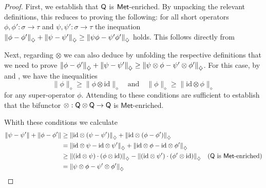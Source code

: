 \documentclass[10pt,a4paper]{amsart}
\theoremstyle{definition}
\theoremstyle{definition}
\theoremstyle{definition}
\theoremstyle{definition}
\theoremstyle{definition}
\theoremstyle{definition}
\begin{document}
\begin{proof}
  First, we establish that $\mathsf{Q}$ is $\mathsf{Met}$-enriched. By unpacking the relevant definitions, this reduces to proving the following: for all short operators $\phi, \phi' : \sigma \to \tau$ and $\psi, \psi' : \sigma \to \tau$ the inequation $\left\lVert \phi-\phi' \right\rVert_{\diamondsuit} + \left\lVert \psi-\psi' \right\rVert_{\diamondsuit} \geq \left\lVert \psi\phi-\psi'\phi' \right\rVert_{\diamondsuit} $ holds. This follows directly from \cite[Proposition 3.38 (second statement)]{watrous2018theory}

  Next, regarding $\otimes$ we can also deduce by unfolding the respective definitions that we need to prove $ \left\lVert \phi - \phi' \right\rVert_{\diamondsuit} + \left\lVert \psi - \psi' \right\rVert_{\diamondsuit} \geq \left\lVert \psi \otimes \phi - \psi' \otimes \phi' \right\rVert_{\diamondsuit}$. 
  For this case,  by \cite[Corollary 3.47]{watrous2018theory} and \cite[Proposition 3.44]{watrous2018theory} , we have the inequalities  
  \[
  \| \phi \|_\diamond \geq \| \phi \otimes \mathrm{id} \|_\diamond
  \quad \text{and} \quad  
  \| \phi \|_\diamond \geq \| \mathrm{id} \otimes \phi \|_\diamond
  \]  
  for any super-operator \( \phi \). Attending to \cite[ Proof of proposition 4.1]{dahlqvist2023syntactic} these conditions are sufficient to establish that the bifunctor $\otimes : \mathsf{Q} \otimes \mathsf{Q} \to \mathsf{Q}$ is $\mathsf{Met}$-enriched.


   Whith these conditions we calculate
  \begin{align*}
      \|\psi - \psi'\| + \|\phi - \phi'\| 
      &\geq \left\lVert \mathrm{id} \otimes \left(\psi-\psi'\right) \right\rVert_{\diamondsuit} + \left\lVert \mathrm{id} \otimes \left(\phi-\phi'\right) \right\rVert_{\diamondsuit}  \\
      &=  \left\lVert \mathrm{id} \otimes \psi- \mathrm{id} \otimes\psi' \right\rVert_{\diamondsuit} + \left\lVert \mathrm{id} \otimes \phi- \mathrm{id} \otimes\phi' \right\rVert_{\diamondsuit} \\
      &\geq \left\lVert \left( \mathrm{id} \otimes \psi \right) \cdot \left( \phi \otimes \mathrm{id} \right) \right\rVert_{\diamondsuit} -  \left\lVert \left( \mathrm{id} \otimes \psi' \right) \cdot \left( \phi' \otimes \mathrm{id} \right) \right\rVert_{\diamondsuit} & (\mathsf{Q} \text{ is } \mathsf{Met}\text{-enriched}) \\
      &= \left\lVert \psi \otimes \phi - \psi' \otimes \phi' \right\rVert_{\diamondsuit}
  \end{align*}

\end{proof}
\end{document}
